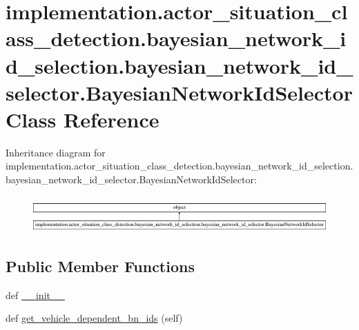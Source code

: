\hypertarget{classimplementation_1_1actor__situation__class__detection_1_1bayesian__network__id__selection_1_40d4bcf4976295a8eb746907b1105fdb}{}\section{implementation.\+actor\+\_\+situation\+\_\+class\+\_\+detection.\+bayesian\+\_\+network\+\_\+id\+\_\+selection.\+bayesian\+\_\+network\+\_\+id\+\_\+selector.\+Bayesian\+Network\+Id\+Selector Class Reference}
\label{classimplementation_1_1actor__situation__class__detection_1_1bayesian__network__id__selection_1_40d4bcf4976295a8eb746907b1105fdb}
Inheritance diagram for implementation.\+actor\+\_\+situation\+\_\+class\+\_\+detection.\+bayesian\+\_\+network\+\_\+id\+\_\+selection.\+bayesian\+\_\+network\+\_\+id\+\_\+selector.\+Bayesian\+Network\+Id\+Selector\+:\begin{figure}[H]
\begin{center}
\leavevmode
\includegraphics[height=1.407035cm]{classimplementation_1_1actor__situation__class__detection_1_1bayesian__network__id__selection_1_40d4bcf4976295a8eb746907b1105fdb}
\end{center}
\end{figure}
\subsection*{Public Member Functions}
\begin{DoxyCompactItemize}
\item 
def \hyperlink{classimplementation_1_1actor__situation__class__detection_1_1bayesian__network__id__selection_1_40d4bcf4976295a8eb746907b1105fdb_a49e353ebf19ea663988d4b0f3e66960a}{\+\_\+\+\_\+init\+\_\+\+\_\+}
\item 
def \hyperlink{classimplementation_1_1actor__situation__class__detection_1_1bayesian__network__id__selection_1_40d4bcf4976295a8eb746907b1105fdb_a26c3e226300ec095b5751b34622f49a4}{get\+\_\+vehicle\+\_\+dependent\+\_\+bn\+\_\+ids} (self)
\end{DoxyCompactItemize}
